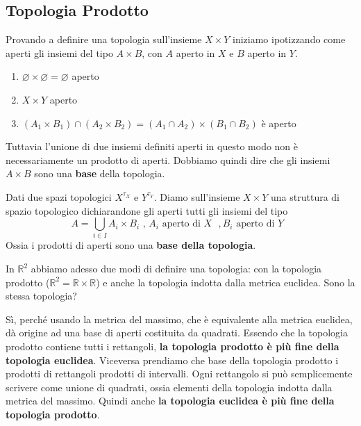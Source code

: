 \subsection{Topologia Prodotto}
Provando a definire una topologia sull'insieme \(X \times  Y\) iniziamo
ipotizzando come aperti gli insiemi del tipo \(A \times  B\), con \(A\) aperto
in \(X\) e \(B \) aperto in \(Y\).
\begin{enumerate}[label = \arabic*)]
    \item \(\varnothing \times  \varnothing = \varnothing\) aperto
    \item \(X \times Y\) aperto
    \item \((A_{1} \times B_{1}) \cap (A_{2} \times B_{2}) = (A_{1} \cap A_{2})
        \times (B_{1} \cap B_{2})\) è aperto
\end{enumerate}
Tuttavia l'unione di due insiemi definiti aperti in questo modo non è
necessariamente un prodotto di aperti. Dobbiamo quindi dire che gli insiemi \(A
\times B\) sono una \textbf{base} della topologia.

\begin{definition}
    Dati due spazi topologici \(X^{\tau_X}\) e \(Y^{\tau_Y}\). Diamo
    sull'insieme \(X \times Y\) una struttura di spazio topologico dichiarandone
    gli aperti tutti gli insiemi del tipo
    \[
        A = \bigcup_{i \in  I} A_{i} \times  B_{i}\,\,,\,A_{i} \text{ aperto di
        \(X\) }, B_{i} \text{ aperto di \(Y\)  }
    \]
    Ossia i prodotti di aperti sono una \textbf{base della topologia}.
\end{definition}

\begin{example}
    In \(\mathbb{R}^2\) abbiamo adesso due modi di definire una topologia: con
    la topologia prodotto (\(\mathbb{R}^2 = \mathbb{R} \times  \mathbb{R}\)) e
    anche la topologia indotta dalla metrica euclidea. Sono la stessa topologia?

    Sì, perché usando la metrica del massimo, che è equivalente alla metrica
    euclidea, dà origine ad una base di aperti costituita da quadrati. Essendo
    che la topologia prodotto contiene tutti i rettangoli, \textbf{la topologia
    prodotto è più fine della topologia euclidea}. Viceversa prendiamo che base
    della topologia prodotto i prodotti di rettangoli prodotti di intervalli.
    Ogni rettangolo si può semplicemente scrivere come unione di quadrati, ossia
    elementi della topologia indotta dalla metrica del massimo. Quindi anche
    \textbf{la topologia euclidea è più fine della topologia prodotto}.
\end{example}

